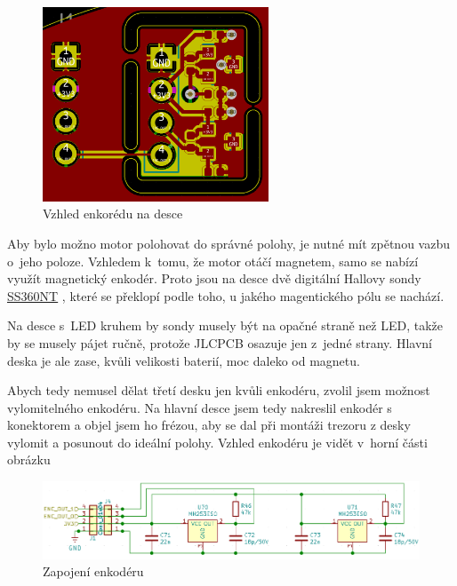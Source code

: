 \begin{figure}
    \centering
    \includegraphics[width= 0.6\textwidth]{kapitoly/obrazky/E4/ir_motor_enkoder/pcb-enc.png}
    \caption{\label{fig:E4-enkoder_pcb}Vzhled enkorédu na desce}
\end{figure}
Aby bylo možno motor polohovat do správné polohy, je nutné mít zpětnou vazbu o~jeho poloze. Vzhledem k~tomu, že motor otáčí magnetem, samo se nabízí využít magnetický enkodér. 
Proto jsou na desce dvě digitální Hallovy sondy \href{https://datasheet.lcsc.com/szlcsc/Honeywell-SS360ST_C111924.pdf}{SS360NT} \parencite{ss360nt}, které se překlopí podle toho, 
u jakého magentického pólu se nachází. 

Na desce s~LED kruhem by sondy musely být na opačné straně než LED, takže by se musely pájet ručně, protože JLCPCB osazuje jen z~je\-dné strany. Hlavní deska je ale zase, 
kvůli velikosti baterií, moc daleko od magnetu. 

Abych tedy nemusel dělat třetí desku jen kvůli enkodéru, zvolil jsem možnost vylomitelného enkodéru. Na hlavní desce jsem tedy nakreslil 
enkodér s konektorem a objel jsem ho frézou, aby se dal při montáži trezoru z desky vylomit a posunout do ideální polohy.
Vzhled enkodéru je vidět v~horní části obrázku 

\begin{figure}[htbp]
    \centering
    \includegraphics[width=\textwidth]{kapitoly/obrazky/E4/ir_motor_enkoder/enc.png}
    \caption{Zapojení enkodéru}
    \label{fig:E4-enkoder}
\end{figure}
